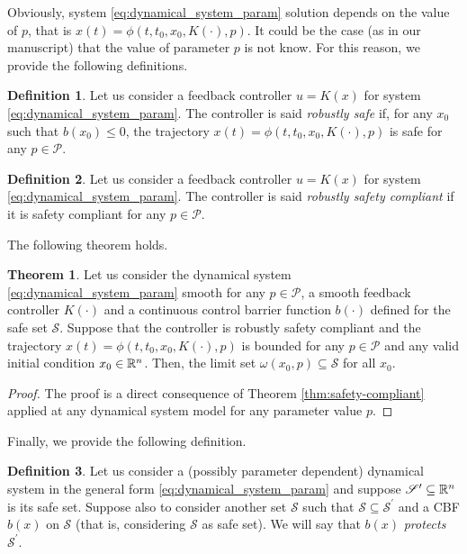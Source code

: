 \documentclass[letterpaper, 10 pt, conference]{ieeeconf}
\newcounter{Definition}
\theoremstyle{definition}
\theoremstyle{nopoint}
\newtheorem{definitionNoPoint}{Definition}
\newtheorem{theorem}{Theorem}[section]
\newcounter{Theorem}
\begin{document}
Obviously, system \eqref{eq:dynamical_system_param} solution depends on the value of $p$, that is  $x(t)=\phi(t,t_0,x_0,K(\cdot),p)$.
It could be the case (as in our manuscript) that the value of parameter $p$ is not know. For this reason,
we provide the following definitions. 

\begin{definitionNoPoint}
Let us consider a feedback controller $u=K(x)$ for system  \eqref{eq:dynamical_system_param}.
The controller is said {\em robustly safe} if, for any $x_0$ such that $b(x_0)\leq 0$, the trajectory  $x(t)=\phi(t,t_0,x_0,K(\cdot),p)$ is safe for any $p\in \mathcal{P}$.
\end{definitionNoPoint}


\begin{definitionNoPoint}
Let us consider a feedback controller $u=K(x)$ for system  \eqref{eq:dynamical_system_param}.
The controller is said {\em robustly safety compliant} if it is safety compliant for any $p\in \mathcal{P}$.
\end{definitionNoPoint}


The following theorem holds.

\begin{theorem} \label{lemma:safety-enforcing-robust}
Let us consider the dynamical system  \eqref{eq:dynamical_system_param} smooth for any $p\in\mathcal{P}$, a smooth feedback controller $K(\cdot)$ and a continuous control barrier function $b(\cdot)$ defined for the safe set $\mathcal{S}$. 
Suppose that the controller is robustly safety compliant and the trajectory
$x(t)=\phi(t,t_0,x_0,K(\cdot),p)$ is bounded for any $p\in\mathcal{P}$ and any valid initial condition $x_0\in\Bbb{R}^n$. Then, the limit set $\omega(x_0,p)\subseteq \mathcal{S}$ for all $x_0$.

\begin{proof}
The proof is a direct consequence of Theorem \ref{thm:safety-compliant} applied at any dynamical system model for any parameter value $p$.
\end{proof}
\end{theorem}


Finally, we provide the following definition. 

\begin{definitionNoPoint}\label{def:protecting_barrier}
Let us consider a (possibly parameter dependent) dynamical system in the general form \eqref{eq:dynamical_system_param} and suppose $\mathcal{S}^\prime\subseteq \Bbb{R}^n$ is its safe set. Suppose also to consider another set $\mathcal{S}$ such that $\mathcal{S}\subseteq \mathcal{S}^\prime$ and a CBF $b(x)$ on $\mathcal{S}$ (that is, considering $\mathcal{S}$ as safe set). We will say that $b(x)$ {\em protects} $\mathcal{S}^\prime$.
\end{definitionNoPoint}
\end{document}
